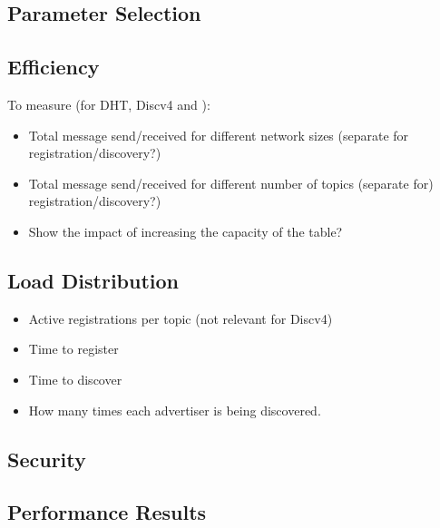 \subsection{Parameter Selection}
\subsection{Efficiency}
To measure (for DHT, Discv4 and \sysname):
\begin{itemize}
    \item Total message send/received for different network sizes (separate for registration/discovery?)
    \item Total message send/received for different number of topics (separate for) registration/discovery?)
    \item Show the impact of increasing the capacity of the table?
    
\end{itemize}

\subsection{Load Distribution}
\begin{itemize}
    \item Active registrations per topic (not relevant for Discv4)
    \item Time to register
    \item Time to discover
    \item How many times each advertiser is being discovered.
\end{itemize}

\subsection{Security}

\subsection{Performance Results}

